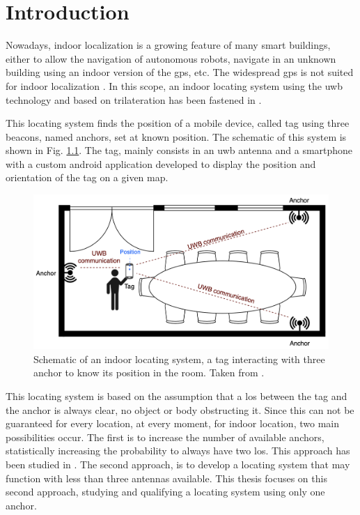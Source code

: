 % 			 
%
%

\chapter{Introduction}
\setcounter{page}{1}
\label{introduction}

Nowadays, indoor localization is a growing feature of many smart buildings, either to allow the navigation of autonomous robots, navigate in an unknown building using an indoor version of the \gls{gps}, etc. The widespread \gls{gps} is not suited for indoor localization \cite{bejuri2013ubiquitous} \cite{kulmer2017using}. In this scope, an indoor locating system using the \gls{uwb} technology and based on trilateration has been fastened in \cite{hannotier2019indoor}.
\vspace{2mm}

This locating system finds the position of a mobile device, called tag using three beacons, named anchors, set at known position. The schematic of this system is shown in Fig. \ref{fig:schem_loc}. The tag, mainly consists in an \gls{uwb} antenna and a smartphone with a custom android application developed to display the position and orientation of the tag on a given map.

\begin{figure}[H]
\centering
\includegraphics[width=.8\linewidth]{Images/schem_loc.png}
\caption{Schematic of an indoor locating system, a tag interacting with three anchor to know its position in the room. Taken from \cite{hannotier2019indoor}.\label{fig:schem_loc}}
\end{figure}

This locating system is based on the assumption that a \gls{los} between the tag and the anchor is always clear, no object or body obstructing it. Since this can not be guaranteed for every location, at every moment, for indoor location, two main possibilities occur. The first is to increase the number of available anchors, statistically increasing the probability to always have two \gls{los}. This approach has been studied in \cite{guyard2019navigation}. The second approach, is to develop a locating system that may function with less than three antennas available. This thesis focuses on this second approach, studying and qualifying a locating system using only one anchor.
\vspace{2mm}

